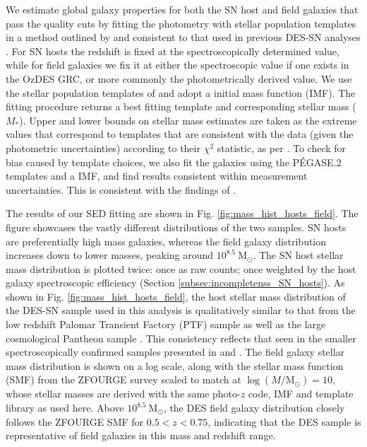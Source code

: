 \documentclass[fleqn,usenatbib]{mnras}
\begin{document}
We estimate global galaxy properties for both the SN host and field galaxies that pass the quality cuts by fitting the photometry with stellar population templates in a method outlined by \citet{Sullivan2006} and consistent to that used in previous DES-SN analyses \citep{Smith2020,Wiseman2020,Kelsey2021}. For SN hosts the redshift is fixed at the spectroscopically determined value, while for field galaxies we fix it at either the spectroscopic value if one exists in the OzDES GRC, or more commonly the photometrically derived value. We use the stellar population templates of \citet{Bruzual2003} and adopt a \citet{Chabrier2003} initial mass function (IMF). The fitting procedure returns a best fitting template and corresponding stellar mass ($M_*$). Upper and lower bounds on stellar mass estimates are taken as the extreme values that correspond to templates that are consistent with the data (given the photometric uncertainties) according to their $\chi^2$ statistic, as per \citet{Sullivan2006}. To check for bias caused by template choices, we also fit the galaxies using the P\'EGASE.2 templates \citep{Fioc1997,LeBorgne2002} and a \citet{Kroupa2001} IMF, and find results consistent within measurement uncertainties. This is consistent with the findings of \citet{Smith2020}. 

The results of our SED fitting are shown in Fig. \ref{fig:mass_hist_hosts_field}. The figure showcases the vastly different distributions of the two samples. SN hosts are preferentially high mass galaxies, whereas the field galaxy distribution increases down to lower masses, peaking around $10^{8.5}~\mathrm{M}_{\odot}$. The SN host stellar mass distribution is plotted twice: once as raw counts; once weighted by the host galaxy spectroscopic efficiency (Section \ref{subsec:incompletenss_SN_hosts}). As shown in Fig. \ref{fig:mass_hist_hosts_field}, the host stellar mass distribution of the DES-SN sample used in this analysis is qualitatively similar to that from the low redshift Palomar Transient Factory (PTF) sample \citep{Pan2014} as well as the large cosmological Pantheon sample \citep{Scolnic2018}. This consistency reflects that seen in the smaller spectroscopically confirmed samples presented in \citet{Wiseman2020} and \citet{Smith2020}. The field galaxy stellar mass distribution is shown on a log scale, along with the stellar mass function (SMF) from the ZFOURGE survey \citep{Tomczak2014} scaled to match at $\log (M/\mathrm{M}_{\odot}) = 10$, whose stellar masses are derived with the same photo-$z$ code, IMF and template library as used here. Above $10^{8.5}~\mathrm{M}_{\odot}$, the DES field galaxy distribution closely follows the ZFOURGE SMF for $0.5<z<0.75$, indicating that the DES sample is representative of field galaxies in this mass and redshift range.
\end{document}
